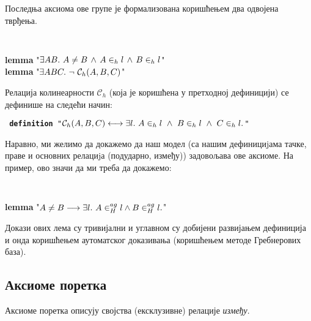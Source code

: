 Последња аксиома ове групе је формализована коришћењем два одвојена
тврђења.
{\tt
\begin{tabbing}
\textbf{lemma} "$\exists A B.\ A \neq B \,\wedge\,A \in_h l \,\wedge\, B \in_h l$"\\
\textbf{lemma} "$\exists A B C.\ \neg\ \colinh{A}{B}{C}$"
\end{tabbing}
}
\noindent Релација колинеарности $\mathcal{C}_h$ (која је коришћена у
претходној дефиницији) се дефинише на следећи начин:

{\tt
\textbf{definition} "$\colinh{A}{B}{C} \longleftrightarrow \exists
l.\ \inh{A}{l}\ \wedge\ \inh{B}{l}\ \wedge \ \inh{C}{l}.$"
}

Наравно, ми желимо да докажемо да наш модел (са нашим дефинициjама
тачке, праве и основних релациjа (подударно, између)) задовољава ове 
аксиоме. На пример, ово значи да ми треба да докажемо:

\vspace{-3mm}
{\tt
\begin{tabbing}
\textbf{lemma} "$A \neq B \longrightarrow \exists l.\ A \in^{ag}_H l \wedge
B \in^{ag}_H l.$"
\end{tabbing}
}

Докази ових лема су тривијални и углавном су добијени развијањем
дефиниција и онда коришћењем аутоматског доказивања (коришћењем методе
Гребнерових база).

\subsection{Аксиоме поретка}
Аксиоме поретка описују својства (ексклузивне) релације \emph{између}.
{\tt
\begin{tabbing}
\hspace{5mm}\=assumes\ \=\kill
\textbf{lemma} "$\beth{A}{B}{C} \longrightarrow A \neq B\,\wedge\,A \neq C\,\wedge\,B \neq C\,\wedge\,\colinh{A}{B}{C}\,\wedge\,\beth{C}{B}{A}$"\\
\textbf{lemma} "$A \neq C \longrightarrow \exists B.\ \beth{A}{C}{B}$"\\
\textbf{lemma} "$\inh{A}{l}\,\wedge\,\inh{B}{l}\,\wedge\, \inh{C}{l}\,\wedge\,A \neq B\,\wedge\,B \neq C\,\wedge\,A \neq C \longrightarrow$}\\
\> $(\beth{A}{B}{C}\ \wedge\ \neg \beth{B}{C}{A}\ \wedge\ \neg \beth{C}{A}{B}) \ \vee$ \\
\> $(\neg\beth{A}{B}{C}\ \wedge\ \beth{B}{C}{A}\ \wedge\  \neg \beth{C}{A}{B}) \ \vee$\\
\>$(\neg\beth{A}{B}{C}\ \wedge\ \neg \beth{B}{C}{A}\ \wedge\ \beth{C}{A}{B})$"}
\end{tabbing}
}

